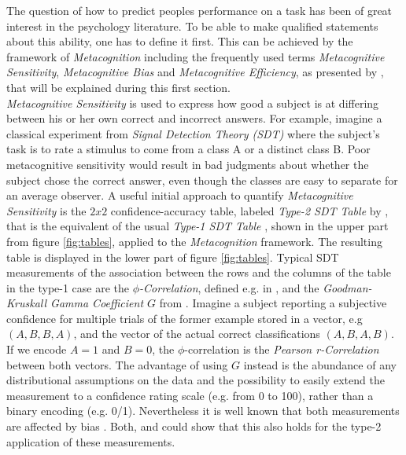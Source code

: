 \documentclass[../main/main.tex]{subfiles}
\begin{document}
	The question of how to predict peoples performance on a task has been of great interest in the psychology literature. To be able to make qualified statements about this ability, one has to define it first.
	This can be achieved by the framework of \textit{Metacognition} including the frequently used terms \textit{Metacognitive Sensitivity}, \textit{Metacognitive Bias} and \textit{Metacognitive Efficiency}, as presented by \citep{fleming2014measure}, that will be explained during this first section.\\
	\textit{Metacognitive Sensitivity} is used to express how good a subject is at differing between his or her own correct and incorrect answers. For example, imagine a classical experiment from \textit{Signal Detection Theory (SDT)} where the subject's task is to rate a stimulus to come from a class A or a distinct class B. Poor metacognitive sensitivity would result in bad judgments about whether the subject chose the correct answer, even though the classes are easy to separate for an average observer. A useful initial approach to quantify \textit{Metacognitive Sensitivity} is the $2x2$ confidence-accuracy table, labeled \textit{Type-2 SDT Table} by \citep{fleming2014measure}, that is the equivalent of the usual \textit{Type-1 SDT Table} \citep{cramer1999mathematical}, shown in the upper part from figure \ref{fig:tables}, applied to the \textit{Metacognition} framework. The resulting table is displayed in the lower part of figure \ref{fig:tables}. Typical SDT measurements of the association between the rows and the columns of the table in the type-1 case are the \textit{$\phi$-Correlation}, defined e.g. in \citep{cramer1999mathematical}, and the \textit{Goodman-Kruskall Gamma Coefficient $G$} from \citep{goodman1963measures}. Imagine a subject reporting a subjective confidence for multiple trials of the former example stored in a vector, e.g $(A, B, B, A)$, and the vector of the actual correct classifications $(A, B, A, B)$. If we encode $A=1$ and $B=0$, the $\phi$-correlation is the \textit{Pearson r-Correlation} between both vectors. The advantage of using $G$ instead is the abundance of any distributional assumptions on the data and the possibility to easily extend the measurement to a confidence rating scale (e.g. from 0 to 100), rather than a binary encoding (e.g. 0/1). Nevertheless it is well known that both measurements are affected by bias \citep{fleming2014measure}. Both, \citep{nelson1984comparison} and \citep{masson2009sources} could show that this also holds for the type-2 application of these measurements.
\end{document}
